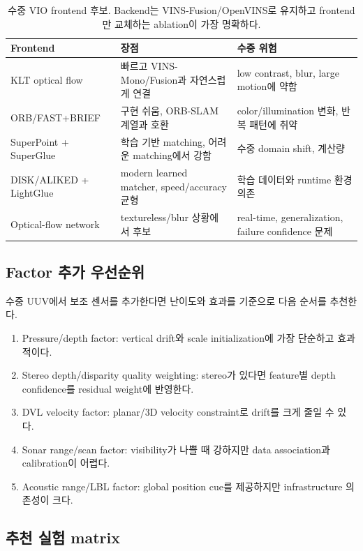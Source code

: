 \documentclass[11pt,a4paper]{article}
\begin{document}
\begin{table}[htbp]
\centering
\small
\begin{tabularx}{\linewidth}{p{34mm}Y Y}
\toprule
\textbf{Frontend} & \textbf{장점} & \textbf{수중 위험} \\
\midrule
KLT optical flow & 빠르고 VINS-Mono/Fusion과 자연스럽게 연결 & low contrast, blur, large motion에 약함 \\
ORB/FAST+BRIEF & 구현 쉬움, ORB-SLAM 계열과 호환 & color/illumination 변화, 반복 패턴에 취약 \\
SuperPoint + SuperGlue & 학습 기반 matching, 어려운 matching에서 강함 & 수중 domain shift, 계산량 \\
DISK/ALIKED + LightGlue & modern learned matcher, speed/accuracy 균형 & 학습 데이터와 runtime 환경 의존 \\
Optical-flow network & textureless/blur 상황에서 후보 & real-time, generalization, failure confidence 문제 \\
\bottomrule
\end{tabularx}
\caption{수중 VIO frontend 후보. Backend는 VINS-Fusion/OpenVINS로 유지하고 frontend만 교체하는 ablation이 가장 명확하다.}
\end{table}

\subsection{Factor 추가 우선순위}

수중 UUV에서 보조 센서를 추가한다면 난이도와 효과를 기준으로 다음 순서를 추천한다.

\begin{enumerate}
  \item Pressure/depth factor: vertical drift와 scale initialization에 가장 단순하고 효과적이다.
  \item Stereo depth/disparity quality weighting: stereo가 있다면 feature별 depth confidence를 residual weight에 반영한다.
  \item DVL velocity factor: planar/3D velocity constraint로 drift를 크게 줄일 수 있다.
  \item Sonar range/scan factor: visibility가 나쁠 때 강하지만 data association과 calibration이 어렵다.
  \item Acoustic range/LBL factor: global position cue를 제공하지만 infrastructure 의존성이 크다.
\end{enumerate}

\subsection{추천 실험 matrix}
\end{document}
